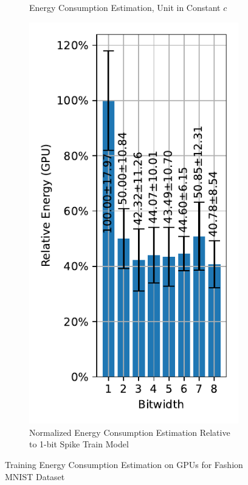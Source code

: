 \begin{figure}[!htpb]
\begin{subfigure}[H]{0.45\textwidth}
                \caption{Energy Consumption Estimation, Unit in Constant $c$}
            \end{subfigure}
            \hfill
            \begin{subfigure}[H]{0.45\textwidth}
                \includegraphics[width=\textwidth]{../standard/FashionMNIST/plots/fashionmnist_train_relative_energy_gpu.pdf}
                \caption{Normalized Energy Consumption Estimation Relative to 1-bit Spike Train Model}
            \end{subfigure}
            \caption{Training Energy Consumption Estimation on GPUs for Fashion MNIST Dataset}
            \label{fig:training_energy_gpu}
        \end{figure}

